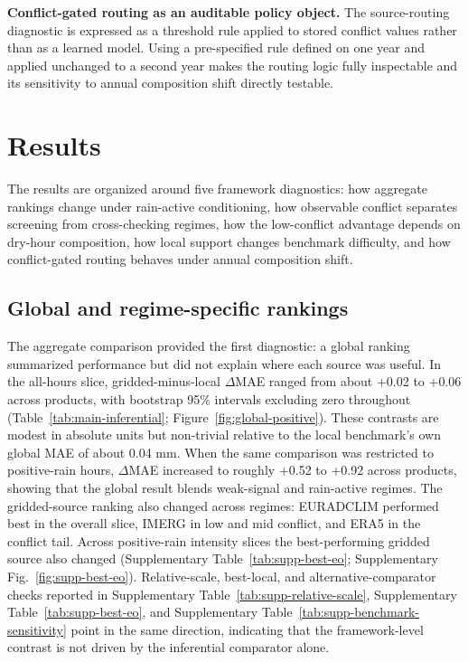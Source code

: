 \documentclass[preprint,12pt]{elsarticle}
\newcommand{\deltamae}{$\Delta$MAE}
\begin{document}
\textbf{Conflict-gated routing as an auditable policy object.} The source-routing diagnostic is expressed as a threshold rule applied to stored conflict values rather than as a learned model. Using a pre-specified rule defined on one year and applied unchanged to a second year makes the routing logic fully inspectable and its sensitivity to annual composition shift directly testable.

\section{Results}

The results are organized around five framework diagnostics: how aggregate rankings change under rain-active conditioning, how observable conflict separates screening from cross-checking regimes, how the low-conflict advantage depends on dry-hour composition, how local support changes benchmark difficulty, and how conflict-gated routing behaves under annual composition shift.

\subsection{Global and regime-specific rankings}

The aggregate comparison provided the first diagnostic: a global ranking summarized performance but did not explain where each source was useful. In the all-hours slice, gridded-minus-local \deltamae{} ranged from about +0.02 to +0.06 across products, with bootstrap 95\% intervals excluding zero throughout (Table~\ref{tab:main-inferential}; Figure~\ref{fig:global-positive}). These contrasts are modest in absolute units but non-trivial relative to the local benchmark's own global MAE of about 0.04 mm. When the same comparison was restricted to positive-rain hours, \deltamae{} increased to roughly +0.52 to +0.92 across products, showing that the global result blends weak-signal and rain-active regimes. The gridded-source ranking also changed across regimes: EURADCLIM performed best in the overall slice, IMERG in low and mid conflict, and ERA5 in the conflict tail. Across positive-rain intensity slices the best-performing gridded source also changed (Supplementary Table~\ref{tab:supp-best-eo}; Supplementary Fig.~\ref{fig:supp-best-eo}). Relative-scale, best-local, and alternative-comparator checks reported in Supplementary Table~\ref{tab:supp-relative-scale}, Supplementary Table~\ref{tab:supp-best-eo}, and Supplementary Table~\ref{tab:supp-benchmark-sensitivity} point in the same direction, indicating that the framework-level contrast is not driven by the inferential comparator alone.
\end{document}
